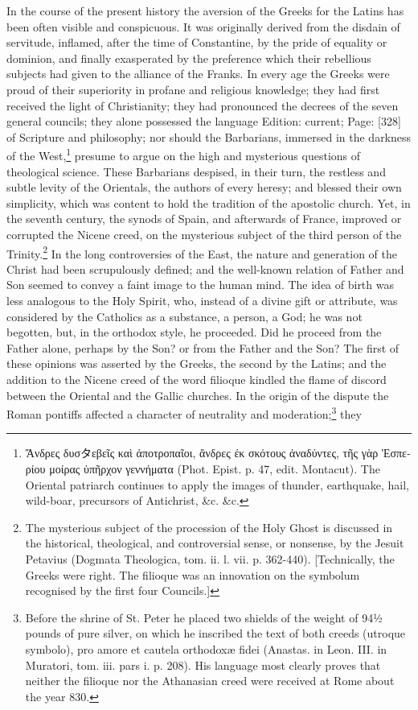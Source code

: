In the course of the present history the aversion of the Greeks for the Latins has been often visible and conspicuous. It was originally derived from the disdain of servitude, inflamed, after the time of Constantine, by the pride of equality or dominion, and finally exasperated by the preference which their rebellious subjects had given to the alliance of the Franks. In every age the Greeks were proud of their superiority in profane and religious knowledge; they had first received the light of Christianity; they had pronounced the decrees of the seven general councils; they alone possessed the language Edition: current; Page: [328] of Scripture and philosophy; nor should the Barbarians, immersed in the darkness of the West,\footnote{\textgreek{\texthebrew{Ἄ}νδρες δυσ}\texthebrew{タ}\textgreek{εβε\texthebrew{ῖ}ς κα\texthebrew{ὶ ἀ}ποτροπα\texthebrew{ῖ}οι, \texthebrew{ἄ}νδρες έκ σκότους \texthebrew{ἀ}ναδύντες, τ\texthebrew{ῆ}ς γ\texthebrew{ὰ}ρ \texthebrew{Ἑ}σπερίου μοίρας \texthebrew{ὑ}π\texthebrew{ῆ}ρχον γεννήματα} (Phot. Epist. p. 47, edit. Montacut). The Oriental patriarch continues to apply the images of thunder, earthquake, hail, wild-boar, precursors of Antichrist, \&c. \&c.} presume to argue on the high and mysterious questions of theological science. These Barbarians despised, in their turn, the restless and subtle levity of the Orientals, the authors of every heresy; and blessed their own simplicity, which was content to hold the tradition of the apostolic church. Yet, in the seventh century, the synods of Spain, and afterwards of France, improved or corrupted the Nicene creed, on the mysterious subject of the third person of the Trinity.\footnote{The mysterious subject of the procession of the Holy Ghost is discussed in the historical, theological, and controversial sense, or nonsense, by the Jesuit Petavius (Dogmata Theologica, tom. ii. l. vii. p. 362-440). [Technically, the Greeks were right. The filioque was an innovation on the symbolum recognised by the first four Councils.]} In the long controversies of the East, the nature and generation of the Christ had been scrupulously defined; and the well-known relation of Father and Son seemed to convey a faint image to the human mind. The idea of birth was less analogous to the Holy Spirit, who, instead of a divine gift or attribute, was considered by the Catholics as a substance, a person, a God; he was not begotten, but, in the orthodox style, he proceeded. Did he proceed from the Father alone, perhaps by the Son? or from the Father and the Son? The first of these opinions was asserted by the Greeks, the second by the Latins; and the addition to the Nicene creed of the word filioque kindled the flame of discord between the Oriental and the Gallic churches. In the origin of the dispute the Roman pontiffs affected a character of neutrality and moderation;\footnote{Before the shrine of St. Peter he placed two shields of the weight of 94½ pounds of pure silver, on which he inscribed the text of both creeds (utroque symbolo), pro amore et cautela orthodoxæ fidei (Anastas. in Leon. III. in Muratori, tom. iii. pars i. p. 208). His language most clearly proves that neither the filioque nor the Athanasian creed were received at Rome about the year 830.} they 